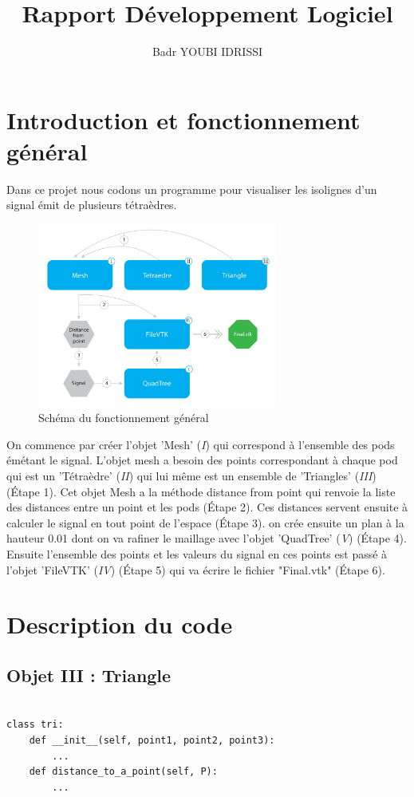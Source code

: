 \documentclass[french]{article}
\title{Rapport Développement Logiciel}
\author{Badr YOUBI IDRISSI}
\begin{document}
\maketitle
\section{Introduction et fonctionnement général}

Dans ce projet nous codons un programme pour visualiser les isolignes 
d'un signal émit de plusieurs tétraèdres. 

\begin{figure}[h]
	\centering
	\includegraphics[width=0.7\textwidth]{Figures/SchemaNum.png}
	\caption{Schéma du fonctionnement général}
\end{figure}

On commence par créer l'objet 'Mesh' (\textit{I}) qui correspond à l'ensemble des pods émétant le signal.
L'objet mesh a besoin des points correspondant à chaque pod qui est un 'Tétraèdre' (\textit{II}) qui lui
même est un ensemble de 'Triangles' (\textit{III}) (\'Etape 1). Cet objet Mesh a la méthode distance from point qui 
renvoie la liste des distances entre un point et les pods (\'Etape 2). Ces distances servent ensuite à calculer le signal
en tout point de l'espace (\'Etape 3). on crée ensuite un plan à la hauteur 0.01 dont on va rafiner le maillage
avec l'objet 'QuadTree' (\textit{V}) (\'Etape 4). Ensuite l'ensemble des points et les valeurs du signal en ces points est
passé à l'objet 'FileVTK' (\textit{IV}) (\'Etape 5) qui va écrire le fichier "Final.vtk" (\'Etape 6).

\section{Description du code}
	
\subsection{Objet III : Triangle}
\vspace{10pt}
\begin{verbatim}

class tri:
	def __init__(self, point1, point2, point3): 
		...
	def distance_to_a_point(self, P): 
		...
\end{verbatim}
\end{document}

